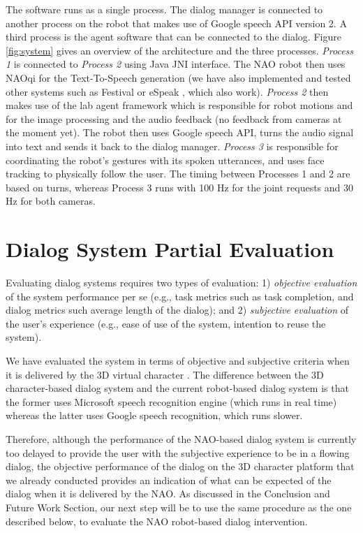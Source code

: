 \documentclass[letterpaper]{article}
\begin{document}
\begin{sloppy}
The software runs as a single process. The
dialog manager is connected to another process on the robot that makes use of Google speech API 
version 2. 
A third process is 
the agent software that can be connected to the dialog. Figure \ref{fig:system} gives an 
overview of the architecture and the three processes. {\em Process 1} is connected to {\em Process 2} using 
Java JNI interface.  The NAO robot then uses NAOqi for the Text-To-Speech 
generation (we have also implemented and tested other systems such as Festival 
\cite{taylor1998architecture} or eSpeak \cite{eSpeak}, which  also work). {\em Process 2} then makes 
use of the lab agent framework which is responsible for robot motions and 
for the image processing and the audio feedback (no feedback from cameras at the moment yet). The 
robot then uses Google speech API, turns the audio signal into text and sends it back to the dialog 
manager. {\em Process 3} is responsible for coordinating the robot's gestures with its spoken utterances, and uses face tracking to physically follow the user.  The timing between Processes 1 and 2 are based on turns, whereas Process 3 runs with 100 Hz for the 
joint requests and 30 Hz for both cameras.

\section{Dialog System Partial Evaluation}

Evaluating dialog systems requires two types of evaluation: 1) {\em objective evaluation} of the 
system performance per se (e.g., task metrics such as task completion, and dialog metrics such 
average length of the dialog); and 2) {\em subjective evaluation} of the user's experience (e.g., 
ease of use of the system, intention to reuse the system).

We have evaluated the system in terms of objective and subjective criteria when it is delivered by the 3D virtual character \cite{YASCLL14}.  The  difference between the 3D character-based dialog system and the current robot-based dialog system is that the former uses Microsoft speech recognition engine (which runs in real time) whereas the latter uses Google speech recognition, which runs  slower.

Therefore, although the performance of the NAO-based dialog system is currently too delayed to provide the user with the subjective experience to be in a flowing dialog, the objective performance of the dialog on the 3D character platform that we already conducted provides an indication of what can be expected of the dialog when it is delivered by the NAO.  As discussed in the Conclusion and Future Work Section, our next step will be to use the same procedure as the one described below, to evaluate the NAO robot-based dialog intervention.


\end{sloppy}
\end{document}
